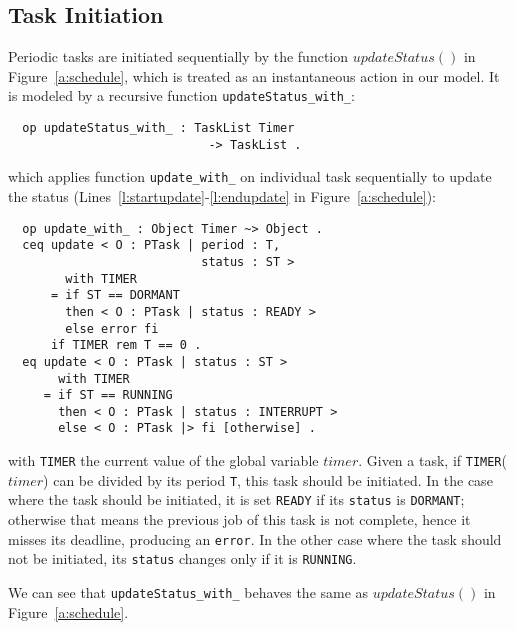 \documentclass[10pt,journal]{IEEEtran}
\begin{document}
{\subsection{Task Initiation}
\label{ss:init}
Periodic tasks are initiated sequentially by the function
$updateStatus()$ in Figure~\ref{a:schedule}, which is treated as an
instantaneous action in our model. It is modeled by a recursive
function \verb|updateStatus_with_|:
\begin{verbatim}
  op updateStatus_with_ : TaskList Timer 
                            -> TaskList . 
\end{verbatim}
which applies function \verb|update_with_| on individual task
sequentially to update the status
(Lines~\ref{l:startupdate}-\ref{l:endupdate} in
Figure~\ref{a:schedule}):
\begin{verbatim}
  op update_with_ : Object Timer ~> Object .
  ceq update < O : PTask | period : T, 
                           status : ST > 
        with TIMER
      = if ST == DORMANT 
        then < O : PTask | status : READY >
        else error fi
      if TIMER rem T == 0 .
  eq update < O : PTask | status : ST > 
       with TIMER
     = if ST == RUNNING 
       then < O : PTask | status : INTERRUPT >
       else < O : PTask |> fi [otherwise] .
\end{verbatim}
with \verb|TIMER| the current value of the global variable $timer$.
Given a task, if \verb|TIMER|($timer$) can be divided by its period
\verb|T|, this task should be initiated.  In the case where the task
should be initiated, it is set \verb|READY| if its \verb|status| is
\verb|DORMANT|; otherwise that means the previous job of this task is
not complete, hence it misses its deadline, producing an
\verb|error|. In the other case where the task should not be
initiated, its \verb|status| changes only if it is \verb|RUNNING|.

We can see that \verb|updateStatus_with_| behaves the same as
$updateStatus()$ in Figure~\ref{a:schedule}.

}
\end{document}
